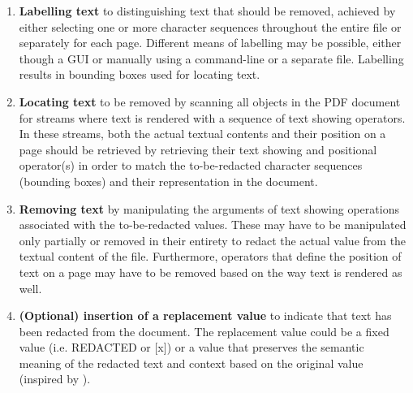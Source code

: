 \begin{enumerate}
    \item \textbf{Labelling text} to distinguishing text that should be removed, achieved by either selecting one or more character sequences throughout the entire file or separately for each page. Different means of labelling may be possible, either though a GUI or manually using a command-line or a separate file. Labelling results in bounding boxes used for locating text.
    
    \item \textbf{Locating text} to be removed by scanning all objects in the PDF document for streams where text is rendered with a sequence of text showing operators. In these streams, both the actual textual contents and their position on a page should be retrieved by retrieving their text showing and positional operator(s) in order to match the to-be-redacted character sequences (bounding boxes) and their representation in the document. 
    
    \item \textbf{Removing text} by manipulating the arguments of text showing operations associated with the to-be-redacted values. These may have to be manipulated only partially or removed in their entirety to redact the actual value from the textual content of the file. Furthermore, operators that define the position of text on a page may have to be removed based on the way text is rendered as well.
    
    \item  \textbf{(Optional) insertion of a replacement value} to indicate that text has been redacted from the document. The replacement value could be a fixed value (i.e. REDACTED or [x]) or a value that preserves the semantic meaning of the redacted text and context based on the original value (inspired by \cite{olstad2023generation}). 
    

\end{enumerate}

